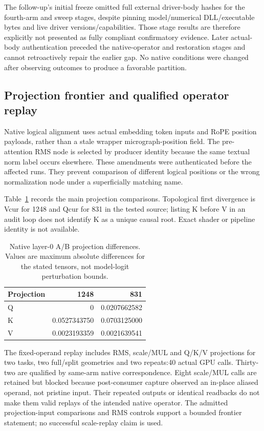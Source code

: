 The follow-up's initial freeze omitted full external driver-body hashes for the fourth-arm and sweep stages, despite pinning model/numerical DLL/executable bytes and live driver versions/capabilities. Those stage results are therefore explicitly not presented as fully compliant confirmatory evidence. Later actual-body authentication preceded the native-operator and restoration stages and cannot retroactively repair the earlier gap. No native conditions were changed after observing outcomes to produce a favorable partition.

\subsection{Projection frontier and qualified operator replay}
Native logical alignment uses actual embedding token inputs and RoPE position payloads, rather than a stale wrapper micrograph-position field. The pre-attention RMS node is selected by producer identity because the same textual norm label occurs elsewhere. These amendments were authenticated before the affected runs. They prevent comparison of different logical positions or the wrong normalization node under a superficially matching name.

Table~\ref{tab:projection} records the main projection comparisons. Topological first divergence is Vcur for 1248 and Qcur for 831 in the tested source; listing K before V in an audit loop does not identify K as a unique causal root. Exact shader or pipeline identity is not available.

\begin{table}[t]\centering\small
\caption{Native layer-0 A/B projection differences. Values are maximum absolute differences for the stated tensors, not model-logit perturbation bounds.}
\label{tab:projection}
\begin{tabular}{@{}lrr@{}}\toprule
Projection&1248&831\\\midrule
Q&0&0.0207662582\\
K&0.0527343750&0.0703125000\\
V&0.0023193359&0.0021639541\\\bottomrule
\end{tabular}
\end{table}

The fixed-operand replay includes RMS, scale/MUL and Q/K/V projections for two tasks, two full/split geometries and two repeats:40 actual GPU calls. Thirty-two are qualified by same-arm native correspondence. Eight scale/MUL calls are retained but blocked because post-consumer capture observed an in-place aliased operand, not pristine input. Their repeated outputs or identical readbacks do not make them valid replays of the intended native operator. The admitted projection-input comparisons and RMS controls support a bounded frontier statement; no successful scale-replay claim is used.

